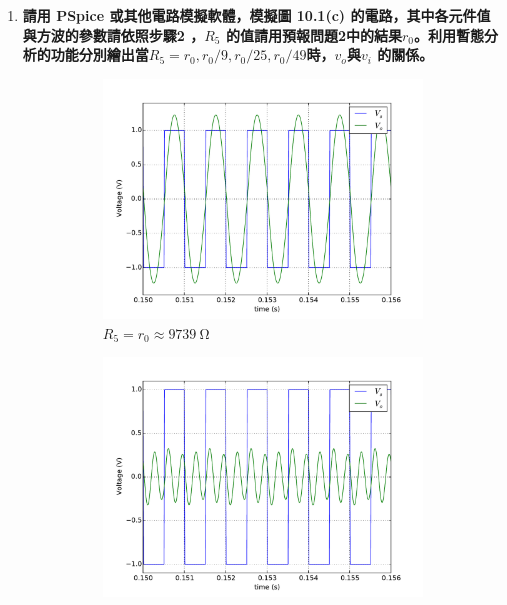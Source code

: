 \documentclass[12pt, a4paper]{article}
\def\large{\fontsize{14}{21}\selectfont}
\begin{document}
\begin{enumerate}[itemsep=20pt, topsep=10pt]
  \item {\large\bf 請用 PSpice 或其他電路模擬軟體，模擬圖 10.1(c) 的電路，其中各元件值與方波的參數請依照步驟2 ，$R_5$ 的值請用預報問題2中的結果$r_0$。利用暫態分析的功能分別繪出當$R_5 = r_0, r_0/9, r_0/25, r_0/49$時，$v_o$與$v_i$ 的關係。}  \\[10pt]
    \begin{figure}[H]
      \centering
      \begin{subfigure}[b]{0.45\textwidth}
        \includegraphics[width=1\textwidth]{circuit/p1.pdf}
        \caption{$R_5 = r_0 \approx \SI{9739}{\ohm} $}
      \end{subfigure}
      \begin{subfigure}[b]{0.45\textwidth}
        \includegraphics[width=1\textwidth]{circuit/p9.pdf}

\end{subfigure}
\end{figure}
\end{enumerate}
\end{document}
